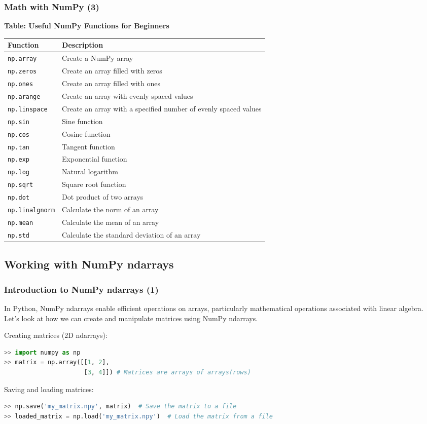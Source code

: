 \begin{frame}[fragile]
  \frametitle{Math with NumPy (3)}
  \textbf{Table: Useful NumPy Functions for Beginners}

  \begin{tabular}{l|l}
  Function & Description \\
  \hline
  \lstinline$np.array$ & Create a NumPy array \\
  \lstinline$np.zeros$ & Create an array filled with zeros \\
  \lstinline$np.ones$ & Create an array filled with ones \\
  \lstinline$np.arange$ & Create an array with evenly spaced values \\
  \lstinline$np.linspace$ & Create an array with a specified number of evenly spaced values \\
  \lstinline$np.sin$ & Sine function \\
  \lstinline$np.cos$ & Cosine function \\
  \lstinline$np.tan$ & Tangent function \\
  \lstinline$np.exp$ & Exponential function \\
  \lstinline$np.log$ & Natural logarithm \\
  \lstinline$np.sqrt$ & Square root function \\
  \lstinline$np.dot$ & Dot product of two arrays \\
  \lstinline$np.linalgnorm$ & Calculate the norm of an array \\
  \lstinline$np.mean$ & Calculate the mean of an array \\
  \lstinline$np.std$ & Calculate the standard deviation of an array \\
  \end{tabular}
\end{frame}


\subsection*{Working with NumPy ndarrays}
\begin{frame}[fragile]
  \frametitle{Introduction to NumPy ndarrays (1)}
  In Python, NumPy ndarrays enable efficient operations on arrays, particularly mathematical operations associated with linear algebra. Let's look at how we can create and manipulate matrices using NumPy ndarrays.\pause
  
  Creating matrices (2D ndarrays):
  \begin{lstlisting}[language=Python, numbers=none]
>> import numpy as np
>> matrix = np.array([[1, 2], 
                      [3, 4]]) # Matrices are arrays of arrays(rows)
  \end{lstlisting}\pause

  Saving and loading matrices:
  \begin{lstlisting}[language=Python, numbers=none]
>> np.save('my_matrix.npy', matrix)  # Save the matrix to a file
>> loaded_matrix = np.load('my_matrix.npy')  # Load the matrix from a file
  \end{lstlisting}
\end{frame}

